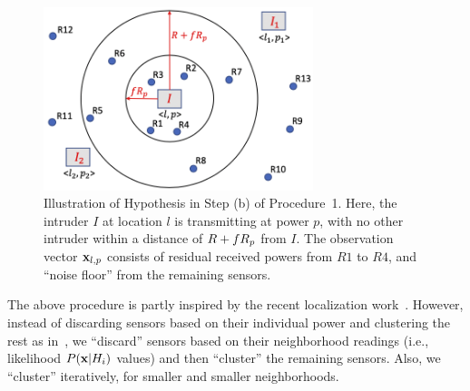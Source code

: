 \begin{figure}
	\centering
	\vspace{-0.1in}
	\includegraphics[width=0.7\textwidth]{chapters/ipsn/figures/mmap.png}
	\vspace{-0.1in}
	\caption{Illustration of Hypothesis \hlp in Step (b) of
          Procedure~1. Here, the intruder $I$ at location $l$ is
          transmitting at power $p$, with no other intruder within a
          distance of $R + fR_p$ from $I$. The observation vector
          $\mathbf{x}_{l,p}$ consists of residual received powers from $R1$ to
          $R4$, and ``noise floor'' from the remaining sensors.}
	\vspace{-0.2in}
	\label{fig:mmap}
\end{figure}

The above procedure is partly inspired by the recent localization
work~\cite{clustering}. However, instead of discarding sensors based
on their individual power and clustering the rest as
in~\cite{clustering}, we ``discard'' sensors based on their
neighborhood readings (i.e., likelihood $P(\mathbf{x}| H_i)$ values) and then
``cluster'' the remaining sensors. Also, we ``cluster'' iteratively,
for smaller and smaller neighborhoods.


